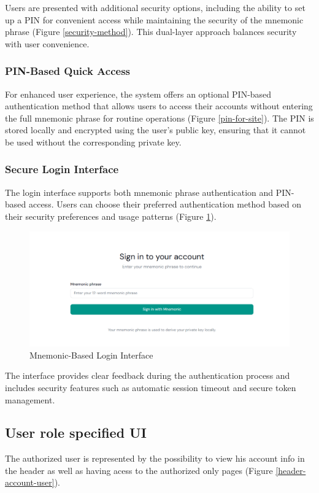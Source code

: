 Users are presented with additional security options, including the ability to set up a PIN for convenient access while maintaining the security of the mnemonic phrase (Figure \ref{security-method}). This dual-layer approach balances security with user convenience.

\subsubsection{PIN-Based Quick Access}
For enhanced user experience, the system offers an optional PIN-based authentication method that allows users to access their accounts without entering the full mnemonic phrase for routine operations (Figure \ref{pin-for-site}). The PIN is stored locally and encrypted using the user's public key, ensuring that it cannot be used without the corresponding private key.

\subsubsection{Secure Login Interface}
The login interface supports both mnemonic phrase authentication and PIN-based access. Users can choose their preferred authentication method based on their security preferences and usage patterns (Figure \ref{mnemonic-login}).

\begin{figure}[H]
    \centering
    \includegraphics[width=18cm]{"images/siteUI/mnemonicLogin.png"}
    \caption{Mnemonic-Based Login Interface}
    \label{mnemonic-login}
\end{figure}

The interface provides clear feedback during the authentication process and includes security features such as automatic session timeout and secure token management.

\subsection{User role specified UI}
The authorized user is represented by the possibility to view his account info in the header as well as having acess to the authorized only pages (Figure \ref{header-account-user}).

